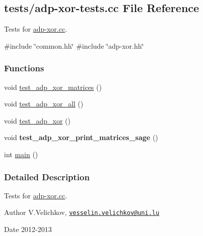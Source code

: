 \hypertarget{adp-xor-tests_8cc}{\subsection{tests/adp-\/xor-\/tests.cc \-File \-Reference}
\label{adp-xor-tests_8cc}
}


\-Tests for \hyperlink{adp-xor_8cc}{adp-\/xor.\-cc}.  


{\ttfamily \#include \char`\"{}common.\-hh\char`\"{}}\*
{\ttfamily \#include \char`\"{}adp-\/xor.\-hh\char`\"{}}\*
\subsubsection*{\-Functions}
\begin{DoxyCompactItemize}
\item 
void \hyperlink{adp-xor-tests_8cc_aa22a695d1bf823830ff2d88ecff93895}{test\-\_\-adp\-\_\-xor\-\_\-matrices} ()
\item 
void \hyperlink{adp-xor-tests_8cc_add84352bd1e4d6a8f991d63a0af4c5ff}{test\-\_\-adp\-\_\-xor\-\_\-all} ()
\item 
void \hyperlink{adp-xor-tests_8cc_adc05ac9f79ca62cf9877efd4bc7db63b}{test\-\_\-adp\-\_\-xor} ()
\item 
\hypertarget{adp-xor-tests_8cc_a430f2b84f34945a27aaa3683d02558ec}{void {\bfseries test\-\_\-adp\-\_\-xor\-\_\-print\-\_\-matrices\-\_\-sage} ()}\label{adp-xor-tests_8cc_a430f2b84f34945a27aaa3683d02558ec}

\item 
int \hyperlink{adp-xor-tests_8cc_ae66f6b31b5ad750f1fe042a706a4e3d4}{main} ()
\end{DoxyCompactItemize}


\subsubsection{\-Detailed \-Description}
\-Tests for \hyperlink{adp-xor_8cc}{adp-\/xor.\-cc}. \begin{DoxyAuthor}{\-Author}
\-V.\-Velichkov, \href{mailto:vesselin.velichkov@uni.lu}{\tt vesselin.\-velichkov@uni.\-lu} 
\end{DoxyAuthor}
\begin{DoxyDate}{\-Date}
2012-\/2013 
\end{DoxyDate}



